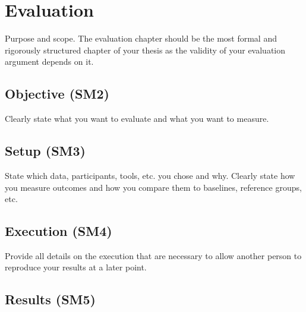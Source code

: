 \documentclass[12pt,a4paper,footinclude=true,twoside,headinclude=true]{report}
\begin{document}
\chapter{Evaluation}\label{sec:evaluation}

\textsf{Purpose and scope}. The evaluation chapter should be the most formal and rigorously structured chapter of your thesis as the validity of your evaluation argument depends on it.

\section{Objective (SM2)}\label{sec:evaluation:objective}

Clearly state what you want to evaluate and what you want to measure.

\section{Setup (SM3)}\label{sec:evaluation:setup}

State which data, participants, tools, etc. you chose and why. Clearly state how you measure outcomes and how you compare them to baselines, reference groups, etc.

\section{Execution (SM4)}\label{sec:evaluation:execution}

Provide all details on the execution that are necessary to allow another person to reproduce your results at a later point.

\section{Results (SM5)}\label{sec:evaluation:results}
\end{document}
